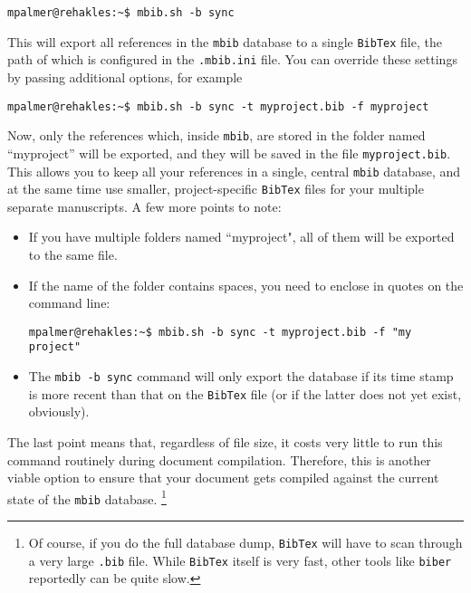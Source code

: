 \documentclass[10pt]{article}
\newcommand*{\mbib}{\texttt{mbib}\xspace}
\newcommand*{\bibtex}{\texttt{BibTex}\xspace}
\newcommand*{\ini}{\texttt{.mbib.ini}\xspace}
\begin{document}
\begin{verbatim}
mpalmer@rehakles:~$ mbib.sh -b sync
\end{verbatim}

\noindent This will export all references in the \mbib database to a single \bibtex file, the path of which is configured in the \ini file. You can override these settings by passing additional options, for example 

\begin{verbatim}
mpalmer@rehakles:~$ mbib.sh -b sync -t myproject.bib -f myproject
\end{verbatim}

\noindent Now, only the references which, inside \mbib, are stored in the folder named ``myproject'' will be exported, and they will be saved in the file \texttt{myproject.bib}. This allows you to keep all your references in a single, central \mbib database, and at the same time use smaller, project-specific \bibtex files for your multiple separate manuscripts. A few more points to note: 

\begin{itemize}
\item If you have multiple folders named ``myproject", all of them will be exported to the same file. 

\item If the name of the folder contains spaces, you need to enclose in quotes on the command line:

\begin{verbatim}
mpalmer@rehakles:~$ mbib.sh -b sync -t myproject.bib -f "my project"
\end{verbatim}

\item The \texttt{\mbib\ -b sync} command will only export the database if its time stamp is more recent than that on the \bibtex file (or if the latter does not yet exist, obviously). 

\end{itemize}

\noindent The last point means that, regardless of file size, it costs very little to run this command routinely during document compilation. Therefore, this is another viable option to ensure that your document gets compiled against the current state of the \mbib database.%
%
\footnote{Of course, if you do the full database dump, \bibtex will have to scan through a very large \texttt{.bib} file. While \bibtex itself is very fast, other tools like \texttt{biber} reportedly can be quite slow.}
\end{document}
